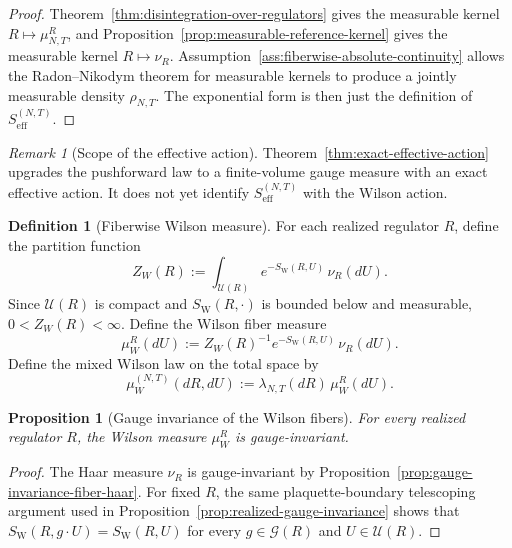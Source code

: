 \documentclass[11pt]{article}
\newtheorem{proposition}[theorem]{Proposition}
\theoremstyle{definition}
\newtheorem{definition}[theorem]{Definition}
\theoremstyle{remark}
\newtheorem{remark}[theorem]{Remark}
\begin{document}
\begin{proof}
Theorem~\ref{thm:disintegration-over-regulators} gives the measurable kernel
\(R\mapsto \mu_{N,T}^R\), and
Proposition~\ref{prop:measurable-reference-kernel} gives the measurable kernel
\(R\mapsto \nu_R\). Assumption~\ref{ass:fiberwise-absolute-continuity} allows
the Radon--Nikodym theorem for measurable kernels to produce a jointly
measurable density \(\rho_{N,T}\). The exponential form is then just the
definition of \(S_{\mathrm{eff}}^{(N,T)}\).
\end{proof}

\begin{remark}[Scope of the effective action]
\label{rem:effective-action-scope}
Theorem~\ref{thm:exact-effective-action} upgrades the pushforward law to a
finite-volume gauge measure with an exact effective action. It does not yet
identify \(S_{\mathrm{eff}}^{(N,T)}\) with the Wilson action.
\end{remark}

\begin{definition}[Fiberwise Wilson measure]
\label{def:fiberwise-wilson-measure}
For each realized regulator \(R\), define the partition function
\[
Z_W(R):=\int_{\mathscr U(R)} e^{-S_{\mathrm W}(R,U)}\,\nu_R(dU).
\]
Since \(\mathscr U(R)\) is compact and \(S_{\mathrm W}(R,\cdot)\) is bounded
below and measurable, \(0<Z_W(R)<\infty\). Define the Wilson fiber measure
\[
\mu_W^R(dU):=Z_W(R)^{-1}e^{-S_{\mathrm W}(R,U)}\,\nu_R(dU).
\]
Define the mixed Wilson law on the total space by
\[
\mu_W^{(N,T)}(dR,dU):=\lambda_{N,T}(dR)\,\mu_W^R(dU).
\]
\end{definition}

\begin{proposition}[Gauge invariance of the Wilson fibers]
\label{prop:gauge-invariance-wilson-fibers}
For every realized regulator \(R\), the Wilson measure \(\mu_W^R\) is
gauge-invariant.
\end{proposition}

\begin{proof}
The Haar measure \(\nu_R\) is gauge-invariant by
Proposition~\ref{prop:gauge-invariance-fiber-haar}. For fixed \(R\), the same
plaquette-boundary telescoping argument used in
Proposition~\ref{prop:realized-gauge-invariance} shows that
\(S_{\mathrm W}(R,g\cdot U)=S_{\mathrm W}(R,U)\) for every
\(g\in\mathcal G(R)\) and \(U\in\mathscr U(R)\).
\end{proof}
\end{document}
